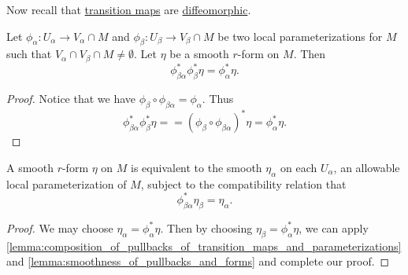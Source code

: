 \documentclass[notoc,notitlepage]{tufte-book}
\begin{document}
Now recall that \hyperref[defn:transition_map]{transition maps} are
\hyperref[propo:transition_maps_are_diffeomorphisms]{diffeomorphic}.

\begin{lemma}\label{lemma:composition_of_pullbacks_of_transition_maps_and_parameterizations}
  Let $\phi_\alpha : U_\alpha \to V_\alpha \cap M$ and $\phi_\beta : U_\beta \to
  V_\beta \cap M$ be two local parameterizations for $M$ such that $V_\alpha \cap
  V_\beta \cap M \neq \emptyset$. Let $\eta$ be a smooth $r$-form on $M$. Then
  \begin{equation}\label{eq:composition_of_pullbacks_of_transition_maps_and_parameterizations}
    \phi^*_{\beta \alpha} \phi_\beta^* \eta = \phi_\alpha^* \eta.
  \end{equation}
\end{lemma}

\begin{proof}
  Notice that we have $\phi_\beta \circ \phi_{\beta \alpha} = \phi_\alpha$. Thus
  \begin{equation*}
    \phi^*_{\beta \alpha} \phi_\beta^* \eta = = \left( \phi_\beta \circ
    \phi_{\beta \alpha} \right)^* \eta = \phi_\alpha^* \eta.
  \end{equation*}
\end{proof}

\begin{crly}\label{crly:_r_forms_on_a_submanifold_and_its_parameterizations_are_equivalent}
  A smooth $r$-form $\eta$ on $M$ is equivalent to the smooth $\eta_\alpha$ on
  each $U_\alpha$, an allowable local parameterization of $M$, subject to the
  compatibility relation that
  \begin{equation*}
    \phi_{\beta\alpha}^* \eta_\beta = \eta_\alpha.
  \end{equation*}
\end{crly}

\begin{proof}
  We may choose $\eta_\alpha = \phi_\alpha^* \eta$. Then by choosing $\eta_\beta
  = \phi_\alpha^* \eta$, we can apply
  \cref{lemma:composition_of_pullbacks_of_transition_maps_and_parameterizations}
  and \cref{lemma:smoothness_of_pullbacks_and_forms} and complete our proof.
\end{proof}
\end{document}
